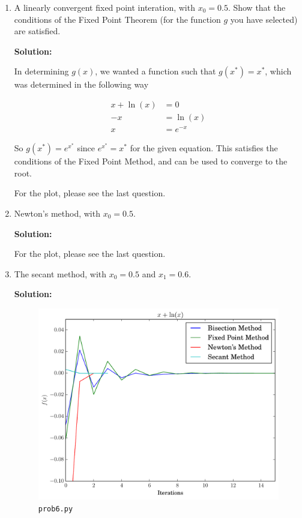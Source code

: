 \documentclass[12pt]{article}
\begin{document}
\begin{enumerate}
\begin{enumerate}
\begin{enumerate}
    {\bf Solution:}

    This interval is valid because the sign changes in the domain $[0.5, 0.6]$ so
    the Bisection method can be used. For the plot, please see the last question.

    \item A linearly convergent fixed point interation, with $x_{0} = 0.5$. Show that
    the conditions of the Fixed Point Theorem (for the function $g$ you have selected)
    are satisfied.

    {\bf Solution:}

    In determining $g(x)$, we wanted a function such that $g\left(x^{*}\right) = x^{*}$,
    which was determined in the following way

    \begin{align*}
      x + \ln(x) &= 0\\
      -x &= \ln(x)\\
      x &= e^{-x}
    \end{align*}

    So $g\left( x^{*}\right) = e^{x^{*}}$ since $e^{x^{*}} = x^{*}$ for the given equation.
    This satisfies the conditions of the Fixed Point Method, and can be used to
    converge to the root.
    
    For the plot, please see the last question.

    \item Newton's method, with $x_{0} = 0.5$.

    {\bf Solution:}

    For the plot, please see the last question.

    \item The secant method, with $x_{0} = 0.5$ and $x_{1} = 0.6$.

    {\bf Solution:}

    \begin{figure}[H]
      \centering
      \includegraphics[width=.65\textwidth]{hw2_prob6b.pdf}
      \caption{{\tt prob6.py}}
    \end{figure}



\end{enumerate}
\end{enumerate}
\end{enumerate}
\end{document}
